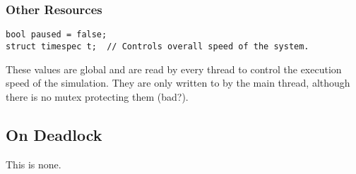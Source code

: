 \documentclass[titlepage]{article}
\begin{document}
\subsubsection{Other Resources}
\begin{lstlisting}
bool paused = false;
struct timespec t;  // Controls overall speed of the system.
\end{lstlisting}

These values are global and are read by every thread to control the
execution speed of the simulation. 
They are only written
to by the main thread, although there is no mutex protecting them (bad?).

\subsection{On Deadlock}
This is none.
\end{document}
